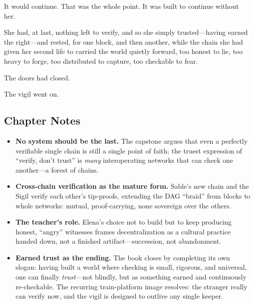 \documentclass[12pt,letterpaper]{book}
\providecommand{\tightlist}{\setlength{\itemsep}{0pt}\setlength{\parskip}{0pt}}
\begin{document}
It would continue. That was the whole point. It was built to continue without her.

She had, at last, nothing left to verify, and so she simply trusted---having earned
the right---and rested, for one block, and then another, while the chain she had given
her second life to carried the world quietly forward, too honest to lie, too heavy to
forge, too distributed to capture, too checkable to fear.

The doors had closed.

The vigil went on.

\hypertarget{chapter-26-notes}{%
\subsection{Chapter Notes}\label{chapter-26-notes}}

\begin{itemize}
\tightlist
\item
  \textbf{No system should be the last.} The capstone argues that even a perfectly
  verifiable single chain is still a single point of faith; the truest expression of
  ``verify, don't trust'' is \emph{many} interoperating networks that can check one
  another---a forest of chains.
\item
  \textbf{Cross-chain verification as the mature form.} Sable's new chain and the
  Sigil verify each other's tip-proofs, extending the DAG ``braid'' from blocks to
  whole networks: mutual, proof-carrying, none sovereign over the others.
\item
  \textbf{The teacher's role.} Elena's choice not to build but to keep producing
  honest, ``angry'' witnesses frames decentralization as a cultural practice handed
  down, not a finished artifact---succession, not abandonment.
\item
  \textbf{Earned trust as the ending.} The book closes by completing its own
  slogan: having built a world where checking is small, rigorous, and universal,
  one can finally \emph{trust}---not blindly, but as something earned and
  continuously re-checkable. The recurring train-platform image resolves: the
  stranger really can verify now, and the vigil is designed to outlive any single
  keeper.
\end{itemize}
\end{document}
